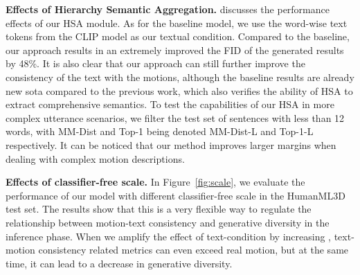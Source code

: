 \documentclass[letterpaper]{article} \usepackage{aaai24}
\begin{document}
\begin{table}[t]



\caption{\textbf{Ablation of Diffusion Step.}}
\label{Table:diffusion}
\end{table}


\noindent\textbf{Effects of Hierarchy Semantic Aggregation.}  discusses the performance effects of our HSA module. As for the baseline model, we use the word-wise text tokens 
 from the CLIP model as our textual condition. Compared to the baseline, our approach results in an extremely improved the FID of the generated results by 48\%. It is also clear that our approach can still further improve the consistency of the text with the motions, although the baseline results are already new sota compared to the previous work, which  also verifies the ability of HSA to extract comprehensive semantics. To test the capabilities of our HSA in more complex utterance scenarios, we filter the test set of sentences with less than 12 words, with MM-Dist and Top-1 being denoted MM-Dist-L and Top-1-L respectively. It can be noticed that our method improves larger margins when dealing with complex motion descriptions.

\noindent\textbf{Effects of classifier-free scale.} In Figure~\ref{fig:scale}, we evaluate the performance of our model with different classifier-free scale  in the HumanML3D test set. The results show that this is a very flexible way to regulate the relationship between motion-text consistency and generative diversity in the inference phase. When we amplify the effect of text-condition by increasing , text-motion consistency related metrics can even exceed real motion, but at the same time, it can lead to a decrease in generative diversity. 
\end{document}
